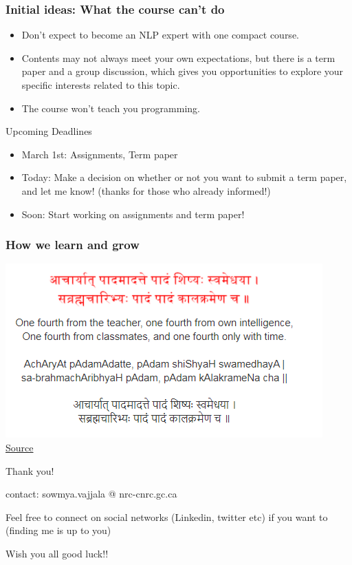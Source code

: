 \documentclass{beamer}
\begin{document}
\begin{frame}
\frametitle{Initial ideas: What the course can't do}
\begin{itemize}
\item Don't expect to become an NLP expert with one compact course. 
\item Contents may not always meet your own expectations, but there is a term paper and a group discussion, which gives you opportunities to explore your specific interests related to this topic.
\item The course won't teach you programming. 
\end{itemize}
\end{frame}

\begin{frame}{Upcoming Deadlines}
    \begin{itemize}
        \item March 1st: Assignments, Term paper
        \item Today: Make a decision on whether or not you want to submit a term paper, and let me know! (thanks for those who already informed!)
        \item Soon: Start working on assignments and term paper!
    \end{itemize}
\end{frame}

\begin{frame}
\frametitle{How we learn and grow}
\includegraphics[width=\textwidth]{figures/acharyat.PNG}
\href{https://blog.practicalsanskrit.com/2009/12/how-we-learn-and-grow.html}{Source}
\end{frame}

\begin{frame}{Thank you!}

contact: sowmya.vajjala @ nrc-cnrc.gc.ca

Feel free to connect on social networks (Linkedin, twitter etc) if you want to (finding me is up to you)

\Large Wish you all good luck!!
\end{frame}
\end{document}
